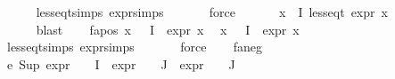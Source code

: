 \begin{isabellebody}
\ \ \ \ \isamarkupfalse%
\ less{\isacharunderscore}{\kern0pt}eq{\isacharunderscore}{\kern0pt}t{\isachardot}{\kern0pt}simps\ expr{\isachardot}{\kern0pt}simps\ \isanewline
\ \ \ \ \isamarkupfalse%
\ force{\isacharplus}{\kern0pt}\isanewline
\ \ \isamarkupfalse%
\ {}\ \isamarkupfalse%
\ {\isachardoublequoteopen}{\isasymforall}x{\isasymin}{\isasymPhi}\ {\isacharbackquote}{\kern0pt}\ I{\isachardot}{\kern0pt}\ less{\isacharunderscore}{\kern0pt}eq{\isacharunderscore}{\kern0pt}t\ {\isacharparenleft}{\kern0pt}expr\ x{\isacharparenright}{\kern0pt}\ {\isacharparenleft}{\kern0pt}{\isasyminfinity}{\isacharcomma}{\kern0pt}\ {\isasyminfinity}{\isacharcomma}{\kern0pt}\ {\isasyminfinity}{\isacharcomma}{\kern0pt}\ {\isasyminfinity}{\isacharcomma}{\kern0pt}\ {}{\isacharcomma}{\kern0pt}\ {}{\isacharparenright}{\kern0pt}{\isachardoublequoteclose}\isanewline
\ \ \ \ \isamarkupfalse%
\ blast\isanewline
\ \ \isamarkupfalse%
\ fa{\isacharunderscore}{\kern0pt}pos{\isacharcolon}{\kern0pt}\ {\isachardoublequoteopen}{\isasymforall}x\ {\isasymin}{\isasymPhi}\ {\isacharbackquote}{\kern0pt}\ I{\isachardot}{\kern0pt}\ \ expr{\isacharunderscore}{\kern0pt}{}\ x\ {\isasymle}\ {}{\isachardoublequoteclose}\isanewline
{\isachardoublequoteopen}{\isasymforall}x\ {\isasymin}{\isasymPhi}\ {\isacharbackquote}{\kern0pt}\ I{\isachardot}{\kern0pt}\ \ expr{\isacharunderscore}{\kern0pt}{}\ x\ {\isasymle}\ {}{\isachardoublequoteclose}\isanewline
\ \ \ \ \isamarkupfalse%
\ less{\isacharunderscore}{\kern0pt}eq{\isacharunderscore}{\kern0pt}t{\isachardot}{\kern0pt}simps\ expr{\isachardot}{\kern0pt}simps\ \isanewline
\ \ \ \ \isamarkupfalse%
\ force{\isacharplus}{\kern0pt}\isanewline
\ \ \isamarkupfalse%
\ fa{\isacharunderscore}{\kern0pt}neg\ \isamarkupfalse%
\ e{}{\isacharcolon}{\kern0pt}\ {\isachardoublequoteopen}{\isacharparenleft}{\kern0pt}Sup\ {\isacharparenleft}{\kern0pt}{\isacharparenleft}{\kern0pt}expr{\isacharunderscore}{\kern0pt}{}\ {\isasymcirc}\ {\isasymPhi}{\isacharparenright}{\kern0pt}\ {\isacharbackquote}{\kern0pt}\ I\ {\isasymunion}\ {\isacharparenleft}{\kern0pt}expr{\isacharunderscore}{\kern0pt}{}\ {\isasymcirc}\ {\isasymPhi}{\isacharparenright}{\kern0pt}\ {\isacharbackquote}{\kern0pt}\ J\ {\isasymunion}\ {\isacharparenleft}{\kern0pt}expr{\isacharunderscore}{\kern0pt}{}\ {\isasymcirc}\ {\isasymPhi}{\isacharparenright}{\kern0pt}\ {\isacharbackquote}{\kern0pt}\ J{\isacharparenright}{\kern0pt}{\isacharparenright}{\kern0pt}\ {\isasymle}\ {}{\isachardoublequoteclose}\isanewline

\end{isabellebody}
